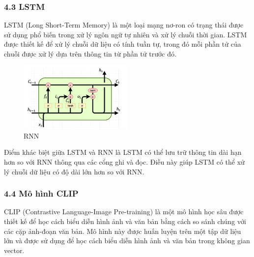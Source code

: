 \documentclass[../main.tex]{subfiles}
\begin{document}
\subsubsection*{4.3 LSTM}

LSTM (Long Short-Term Memory) là một loại mạng nơ-ron có trạng thái được sử dụng phổ biến trong xử lý ngôn ngữ tự nhiên và xử lý chuỗi thời gian. LSTM được thiết kế để xử lý chuỗi dữ liệu có tính tuần tự, trong đó mỗi phần tử của chuỗi được xử lý dựa trên thông tin từ phần tử trước đó.

\begin{figure}[H]
    \centering
    \includegraphics[width=0.5\textwidth]{Image/lstm.png}
    \caption{RNN}
    \label{fig:RNN}
\end{figure}

Điểm khác biệt giữa LSTM và RNN là LSTM có thể lưu trữ thông tin dài hạn hơn so với RNN thông qua các cổng ghi và đọc. Điều này giúp LSTM có thể xử lý chuỗi dữ liệu có độ dài lớn hơn so với RNN.

\subsubsection*{4.4 Mô hình CLIP}

CLIP (Contrastive Language-Image Pre-training) là một mô hình học sâu được thiết kế để học cách biểu diễn hình ảnh và văn bản bằng cách so sánh chúng với các cặp ảnh-đoạn văn bản. Mô hình này được huấn luyện trên một tập dữ liệu lớn và được sử dụng để học cách biểu diễn hình ảnh và văn bản trong không gian vector.
\end{document}
